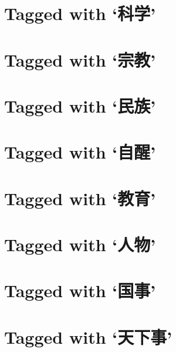 \section*{Tagged with `\textbf{科学}'}

\section*{Tagged with `\textbf{宗教}'}

\section*{Tagged with `\textbf{民族}'}

\section*{Tagged with `\textbf{自醒}'}

\section*{Tagged with `\textbf{教育}'}

\section*{Tagged with `\textbf{人物}'}

\section*{Tagged with `\textbf{国事}'}

\section*{Tagged with `\textbf{天下事}'}
